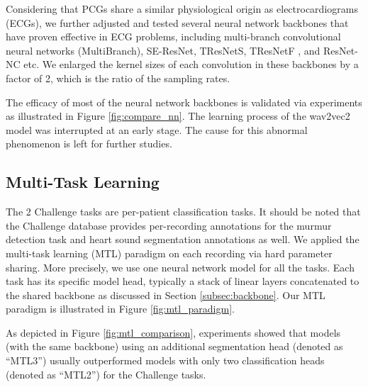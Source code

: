 


Considering that PCGs share a similar physiological origin as electrocardiograms (ECGs), we further adjusted and tested several neural network backbones that have proven effective in ECG problems, including multi-branch convolutional neural networks (MultiBranch), SE-ResNet, TResNetS, TResNetF \cite{Kang_2022_cinc2021_iop}, and ResNet-NC \cite{ribeiro2020automatic} etc. We enlarged the kernel sizes of each convolution in these backbones by a factor of 2, which is the ratio of the sampling rates.

The efficacy of most of the neural network backbones is validated via experiments as illustrated in Figure \ref{fig:compare_nn}. The learning process of the wav2vec2 model was interrupted at an early stage. The cause for this abnormal phenomenon is left for further studies.



\subsection{Multi-Task Learning}
\label{subsec:mtl}

The 2 Challenge tasks \cite{cinc2022} are per-patient classification tasks. It should be noted that the Challenge database \cite{Oliveira_2021_CirCor} provides per-recording annotations for the murmur detection task and heart sound segmentation annotations as well. We applied the multi-task learning (MTL) paradigm \cite{Caruana_1997_mtl} on each recording via hard parameter sharing. More precisely, we use one neural network model for all the tasks. Each task has its specific model head, typically a stack of linear layers concatenated to the shared backbone as discussed in Section \ref{subsec:backbone}. Our MTL paradigm is illustrated in Figure \ref{fig:mtl_paradigm}.



As depicted in Figure \ref{fig:mtl_comparison}, experiments showed that models (with the same backbone) using an additional segmentation head (denoted as ``MTL3'') usually outperformed models with only two classification heads (denoted as ``MTL2'') for the Challenge tasks.

